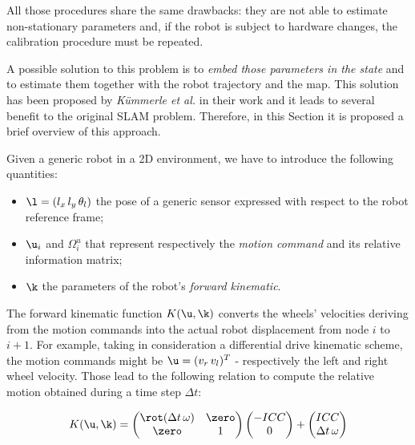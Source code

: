 \noindent All those procedures share the same drawbacks: they are not able to estimate non-stationary parameters and, if the robot is subject to hardware changes, the calibration procedure must be repeated. 

A possible solution to this problem is to \textit{embed those parameters in the state} and to estimate  them together with the robot trajectory and the map. This solution has been proposed by \textit{K\"ummerle et al.} in their work \cite{kummerle2011sclam} and it leads to several benefit to the original SLAM problem. Therefore, in this Section it is proposed a brief overview of this approach.

Given a generic robot in a 2D environment, we have to introduce the following quantities:

\begin{itemize}
    \item $\l = (l_x \, l_y \, \theta_l)$ the pose of a generic sensor expressed with respect to the robot reference frame;
    \item $\u_i$ and $\Omega_i^u$ that represent respectively the \textit{motion command} and its relative information matrix;
    \item $\k$ the parameters of the robot's \textit{forward kinematic}.
\end{itemize}

The forward kinematic function $K(\u, \k)$ converts the wheels' velocities deriving from the motion commands into the actual robot displacement from node $i$ to $i+1$. For example, taking in consideration a differential drive kinematic scheme, the motion commands might be $\u = (v_r \, v_l)^T$ - respectively the left and right wheel velocity. Those lead to the following relation to compute the relative motion obtained during a time step $\Delta t$:

\begin{equation}
    \label{eq:dd_kinematics}
    K(\u, \k) = 
        \begin{pmatrix}
            \rot(\Delta t \, \omega) & \zero \\
            \zero & 1
        \end{pmatrix}
        \begin{pmatrix}
            -ICC \\ 0
        \end{pmatrix}
        +
        \begin{pmatrix}
            ICC \\ \Delta t \, \omega
        \end{pmatrix}
\end{equation}

